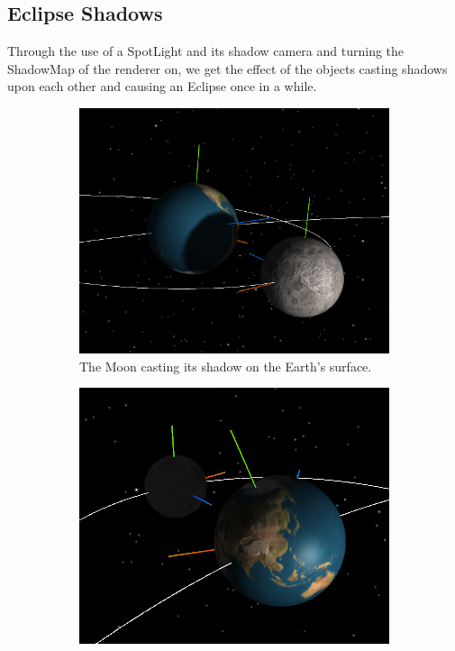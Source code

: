 \documentclass[12pt]{article}
\begin{document}
\subsection{Eclipse Shadows}
Through the use of a SpotLight and its shadow camera and turning the ShadowMap of the renderer on, we get the effect of the objects casting shadows upon each other and causing an Eclipse once in a while.
 \begin{figure}[H]
        \centering
        \begin{subfigure}[b]{0.4\textwidth}
                \includegraphics[width=\textwidth]{images/eclipse1}
                \caption{The Moon casting its shadow on the Earth's surface.}
                \label{fig: The Moon casting its shadow on the Earth's surface.}
	 \end{subfigure}
        \begin{subfigure}[b]{0.4\textwidth}
                \includegraphics[width=\textwidth]{images/eclipse2}

\end{subfigure}
\end{figure}
\end{document}
